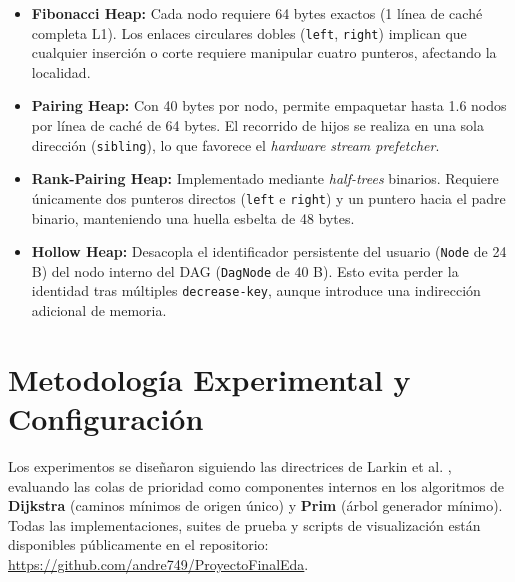 \documentclass[11pt,a4paper]{article}
\begin{document}
\begin{itemize}
    \item \textbf{Fibonacci Heap:} Cada nodo requiere 64 bytes exactos (1 línea de caché completa L1). Los enlaces circulares dobles (\texttt{left}, \texttt{right}) implican que cualquier inserción o corte requiere manipular cuatro punteros, afectando la localidad.
    \item \textbf{Pairing Heap:} Con 40 bytes por nodo, permite empaquetar hasta 1.6 nodos por línea de caché de 64 bytes. El recorrido de hijos se realiza en una sola dirección (\texttt{sibling}), lo que favorece el \textit{hardware stream prefetcher}.
    \item \textbf{Rank-Pairing Heap:} Implementado mediante \textit{half-trees} binarios. Requiere únicamente dos punteros directos (\texttt{left} e \texttt{right}) y un puntero hacia el padre binario, manteniendo una huella esbelta de 48 bytes.
    \item \textbf{Hollow Heap:} Desacopla el identificador persistente del usuario (\texttt{Node} de 24 B) del nodo interno del DAG (\texttt{DagNode} de 40 B). Esto evita perder la identidad tras múltiples \texttt{decrease-key}, aunque introduce una indirección adicional de memoria.
\end{itemize}

\section{Metodología Experimental y Configuración}

Los experimentos se diseñaron siguiendo las directrices de Larkin et al. \cite{larkin2014back}, evaluando las colas de prioridad como componentes internos en los algoritmos de \textbf{Dijkstra} (caminos mínimos de origen único) y \textbf{Prim} (árbol generador mínimo). Todas las implementaciones, suites de prueba y scripts de visualización están disponibles públicamente en el repositorio: \url{https://github.com/andre749/ProyectoFinalEda}.
\end{document}
